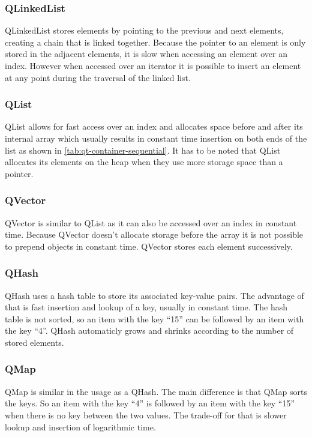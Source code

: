 \subsubsection{QLinkedList}
\label{sec:QLikedList}
QLinkedList stores elements by pointing to the previous and next elements, creating a chain that is linked together. Because the pointer to an element is only stored in the adjacent elements, it is slow when accessing an element over an index. However when accessed over an iterator it is possible to insert an element at any point during the traversal of the linked list.\cite{QtDoc:QLinkedList}

\subsubsection{QList}
\label{sec:QList}
QList allows for fast access over an index and allocates space before and after its internal array which usually results in constant time insertion on both ends of the list as shown in \ref{tab:qt-container-sequential}. It has to be noted that QList allocates its elements on the heap when they use more storage space than a pointer.\cite{QtDoc:QList}
\subsubsection{QVector}
\label{sec:QVector}
QVector is similar to QList as it can also be accessed over an index in constant time. Because QVector doesn't allocate storage before the array it is not possible to prepend objects in constant time. QVector stores each element successively.\cite{QtDoc:QVector}
\subsubsection{QHash}
\label{sec:QHash}
QHash uses a hash table to store its associated key-value pairs. The advantage of that is fast insertion and lookup of a key, usually in constant time. The hash table is not sorted, so an item with the key ``15'' can be followed by an item with the key ``4''. QHash automaticly grows and shrinks according to the number of stored elements. \cite{QtDoc:QHash} 
\subsubsection{QMap}
\label{sec:QMap}
QMap is similar in the usage as a QHash. The main difference is that QMap sorts the keys. So an item with the key ``4'' is followed by an item with the key ``15'' when there is no key between the two values. The trade-off for that is slower lookup and insertion of logarithmic time.
\cite{QtDoc:QMap} 
